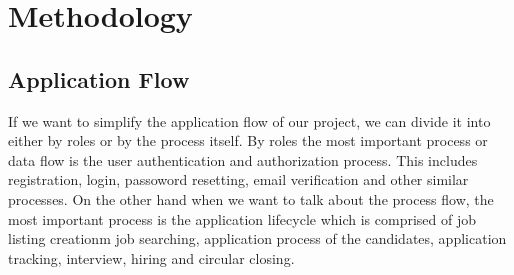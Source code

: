 \documentclass[a4paper, 14pt, openany]{extreport}
\begin{document}
	\chapter{Methodology}
	\section{Application Flow}
	If we want to simplify the application flow of our project, we can divide it into either by roles or by the process itself. By roles the most important process or data flow is the user authentication and authorization process. This includes registration, login, passoword resetting, email verification and other similar processes. On the other hand when we want to talk about the process flow, the most important process is the application lifecycle which is comprised of job listing creationm job searching, application process of the candidates, application tracking, interview, hiring and circular closing.
	\\
\end{document}
